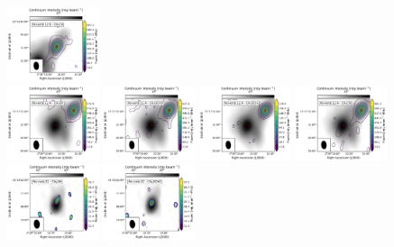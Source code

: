 \begin{figure}[htbp!]
  \includegraphics[width=0.24\textwidth]{./moment0/Set2_ID01_2_CH3CN_257527.pdf}
  \\
  \includegraphics[width=0.24\textwidth]{./moment0/Set2_ID01_CH3OH_243915.pdf}
  \includegraphics[width=0.24\textwidth]{./moment0/Set2_ID01_CH3OCHO_259342.pdf}
  \includegraphics[width=0.24\textwidth]{./moment0/Set2_ID01_CH3OCH3_259311.pdf}
  \includegraphics[width=0.24\textwidth]{./moment0/Set2_ID01_CH3CN_257527.pdf}
  \\
  \includegraphics[width=0.24\textwidth]{./moment0/Set2_ID05_CH3OH_243915.pdf}
  \includegraphics[width=0.24\textwidth]{./moment0/Set2_ID05_CH3OCHO_259342.pdf}

\end{figure}
